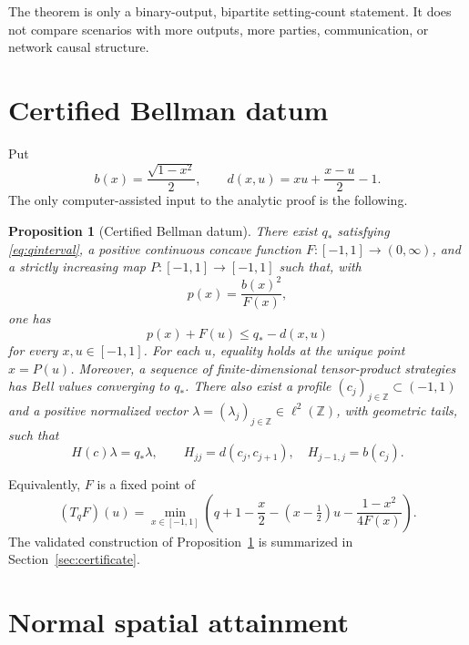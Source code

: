\documentclass[11pt]{article}
\newtheorem{proposition}[theorem]{Proposition}
\begin{document}
The theorem is only a binary-output, bipartite setting-count statement.  It
does not compare scenarios with more outputs, more parties, communication, or
network causal structure.

\section{Certified Bellman datum}

Put
\begin{equation}
b(x)=\frac{\sqrt{1-x^2}}2,
\qquad
d(x,u)=xu+\frac{x-u}{2}-1.                       \label{eq:bd}
\end{equation}
The only computer-assisted input to the analytic proof is the following.

\begin{proposition}[Certified Bellman datum]\label{prop:bellman}
There exist $q_*$ satisfying \eqref{eq:qinterval}, a positive continuous
concave function $F:[-1,1]\to(0,\infty)$, and a strictly increasing map
$P:[-1,1]\to[-1,1]$ such that, with
\[
p(x)=\frac{b(x)^2}{F(x)},
\]
one has
\begin{equation}
p(x)+F(u)\le q_*-d(x,u)                            \label{eq:bellman}
\end{equation}
for every $x,u\in[-1,1]$.  For each $u$, equality holds at the unique point
$x=P(u)$.  Moreover, a sequence of finite-dimensional tensor-product
strategies has Bell values converging to $q_*$.  There also exist a profile
$(c_j)_{j\in\mathbb Z}\subset(-1,1)$ and a positive normalized vector
$\lambda=(\lambda_j)_{j\in\mathbb Z}\in\ell^2(\mathbb Z)$, with geometric
tails, such that
\begin{equation}
H(c)\lambda=q_*\lambda,\qquad
H_{jj}=d(c_j,c_{j+1}),\quad H_{j-1,j}=b(c_j).       \label{eq:wallEigen}
\end{equation}
\end{proposition}

Equivalently, $F$ is a fixed point of
\begin{equation}
(T_qF)(u)=\min_{x\in[-1,1]}
\left(q+1-\frac x2-(x-\tfrac12)u-\frac{1-x^2}{4F(x)}\right). \label{eq:T}
\end{equation}
The validated construction of Proposition~\ref{prop:bellman} is summarized in
Section~\ref{sec:certificate}.

\section{Normal spatial attainment}\label{sec:spatial}
\end{document}
